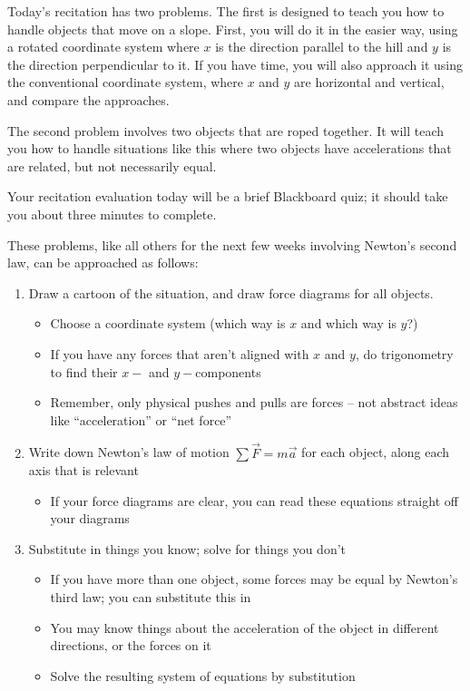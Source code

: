 \documentclass[12pt]{article}
\begin{document}
\Large
\centerline{}
\normalsize
\centerline{}

Today's recitation has two problems. The first is designed to teach you how to handle objects that move on a slope. First, you will do
it in the easier way, using a rotated coordinate system where $x$ is the direction parallel to the hill and $y$ is the direction perpendicular to it. If you have time, you will also approach it using the conventional coordinate system, where $x$ and $y$ are horizontal and vertical, and compare the approaches. 

The second problem involves two objects that are roped together. It will teach you how to handle situations like this where two objects have accelerations that are related, but not necessarily equal.

Your recitation evaluation today will be a brief Blackboard quiz; it should take you about three minutes to complete.

\begin{center}
	\underline{\hspace{0.7\textwidth}}
\end{center}

These problems, like all others for the next few weeks involving Newton's second law, can be approached as follows:

\begin{enumerate}
	\item Draw a cartoon of the situation, and draw force diagrams for all objects.
	\begin{itemize}
		\item Choose a coordinate system (which way is $x$ and which way is $y$?)
		\item If you have any forces that aren't aligned with $x$ and $y$, do trigonometry to find their $x-$ and $y-$components
		\item Remember, only physical pushes and pulls are forces -- not abstract ideas like ``acceleration'' or ``net force''
	\end{itemize}
	\item Write down Newton's law of motion $\sum \vec F = m \vec a$ for each object, along each axis that is relevant
	\begin{itemize}
		\item If your force diagrams are clear, you can read these equations straight off your diagrams
	\end{itemize}
	\item Substitute in things you know; solve for things you don't
	\begin{itemize}
		\item If you have more than one object, some forces may be equal by Newton's third law; you can substitute this in
		\item You may know things about the acceleration of the object in different directions, or the forces on it
		\item Solve the resulting system of equations by substitution
	\end{itemize}


\end{enumerate}
\end{document}
